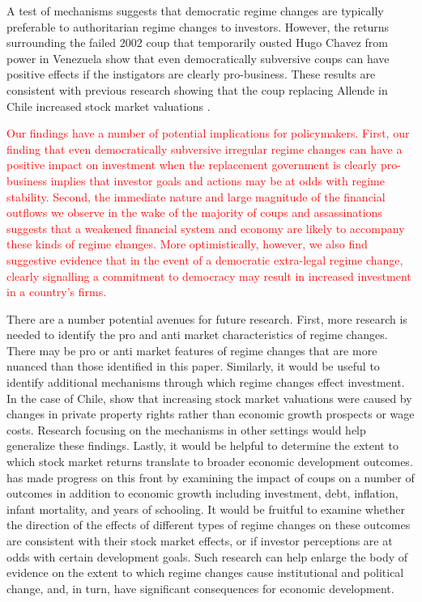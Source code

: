 \documentclass[12pt,final,fleqn]{article}
\theoremstyle{plain}
\begin{document}
A test of mechanisms suggests that democratic regime changes are typically preferable to authoritarian regime changes to investors. However, the returns surrounding the failed 2002 coup that temporarily ousted Hugo Chavez from power in Venezuela show that even democratically subversive coups can have positive effects if the instigators are clearly pro-business. These results are consistent with previous research showing that the coup replacing Allende in Chile increased stock market valuations \citep{girardi2018institution}. 

\textcolor{red}{Our findings have a number of potential implications for policymakers. First, our finding that even democratically subversive irregular regime changes can have a positive impact on investment when the replacement government is clearly pro-business  implies that investor goals and actions may be at odds with regime stability. Second, the immediate nature and large magnitude of the financial outflows we observe in the wake of the majority of coups and assassinations suggests that a weakened financial system and economy are likely to accompany these kinds of regime changes. More optimistically, however, we also find suggestive evidence that in the event of a democratic extra-legal regime change, clearly signalling a commitment to democracy may result in increased investment in a country's firms.}

There are a number potential avenues for future research. First, more research is needed to identify the pro and anti market characteristics of regime changes. There may be pro or anti market features of regime changes that are more nuanced than those identified in this paper. Similarly, it would be useful to identify additional mechanisms through which regime changes effect investment. In the case of Chile,  \citet{girardi2018institution} show that increasing stock market valuations were caused by changes in private property rights rather than economic growth prospects or wage costs. Research focusing on the mechanisms in other settings would help generalize these findings. Lastly, it would be helpful to determine the extent to which stock market returns translate to broader economic development outcomes. \citet{meyersson2016political} has made progress on this front by examining the impact of coups on a number of outcomes in addition to economic growth including investment, debt, inflation, infant mortality, and years of schooling. It would be fruitful to examine whether the direction of the effects of different types of regime changes on these outcomes are consistent with their stock market effects, or if investor perceptions are at odds with certain development goals. Such research can help enlarge the body of evidence on the extent to which regime changes cause institutional and political change, and, in turn, have significant consequences for economic development.
\end{document}
